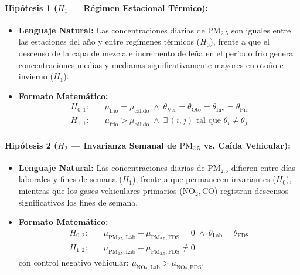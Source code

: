 \documentclass[10pt,twocolumn,a4paper]{article}
\begin{document}
\paragraph{Hipótesis 1 ($H_1$ --- Régimen Estacional Térmico):}
\begin{itemize}
    \item \textbf{Lenguaje Natural:} Las concentraciones diarias de $\text{PM}_{2.5}$ son iguales entre las estaciones del año y entre regímenes térmicos ($H_0$), frente a que el descenso de la capa de mezcla e incremento de leña en el período frío genera concentraciones medias y medianas significativamente mayores en otoño e invierno ($H_1$).
    \item \textbf{Formato Matemático:}
    \begin{align}
        H_{0,1}: &\quad \mu_{\text{frío}} = \mu_{\text{cálido}} \;\wedge\; \theta_{\text{Ver}} = \theta_{\text{Oto}} = \theta_{\text{Inv}} = \theta_{\text{Pri}} \\
        H_{1,1}: &\quad \mu_{\text{frío}} > \mu_{\text{cálido}} \;\wedge\; \exists\,(i,j) \text{ tal que } \theta_i \neq \theta_j
    \end{align}
\end{itemize}

\paragraph{Hipótesis 2 ($H_2$ --- Invarianza Semanal de $\text{PM}_{2.5}$ vs. Caída Vehicular):}
\begin{itemize}
    \item \textbf{Lenguaje Natural:} Las concentraciones diarias de $\text{PM}_{2.5}$ difieren entre días laborales y fines de semana ($H_1$), frente a que permanecen invariantes ($H_0$), mientras que los gases vehiculares primarios ($\text{NO}_2, \text{CO}$) registran descensos significativos los fines de semana.
    \item \textbf{Formato Matemático:}
    \begin{align}
        H_{0,2}: &\quad \mu_{\text{PM}_{2.5},\text{Lab}} - \mu_{\text{PM}_{2.5},\text{FDS}} = 0 \;\wedge\; \theta_{\text{Lab}} = \theta_{\text{FDS}} \\
        H_{1,2}: &\quad \mu_{\text{PM}_{2.5},\text{Lab}} - \mu_{\text{PM}_{2.5},\text{FDS}} \neq 0
    \end{align}
    con control negativo vehicular: $\mu_{\text{NO}_2,\text{Lab}} > \mu_{\text{NO}_2,\text{FDS}}$.
\end{itemize}
\end{document}
